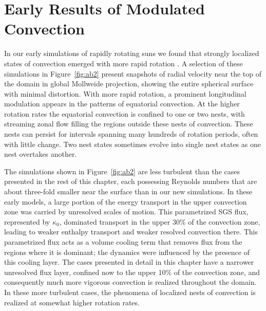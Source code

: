 \section{Early Results of Modulated Convection}
In our early simulations of rapidly rotating suns we found that
strongly localized states of convection emerged with more rapid
rotation \citep{Brown_et_al_2004}.  A selection of these simulations
in Figure~\ref{fig:ab2} present snapshots of radial velocity near the
top of the domain in global Mollweide projection, showing the entire
spherical surface with minimal distortion.  With more rapid rotation,
a prominent longitudinal modulation appears in the patterns of
equatorial convection.  At the higher rotation rates the equatorial
convection is confined to one or two nests, with streaming zonal flow
filling the regions outside these nests of convection.  These nests
can persist for intervals spanning many hundreds of rotation periods,
often with little change.  Two nest states sometimes evolve into
single nest states as one nest overtakes another.

The simulations shown in Figure~\ref{fig:ab2} are less turbulent than
the cases presented in the rest of this chapter, each possessing
Reynolds numbers that are about three-fold smaller near the surface
than in our new simulations. In these early models, a large portion of
the energy transport in the upper convection zone was carried by
unresolved scales of motion.  This parametrized SGS flux, represented
by $\kappa_0$, dominated transport in the upper 30\% of the convection
zone, leading to weaker enthalpy transport and weaker resolved
convection there.  This parametrized flux acts as a volume cooling term
that removes flux from the regions where it is dominant; the dynamics
were influenced by the presence of this cooling layer.  The cases
presented in detail in this chapter have a narrower unresolved flux layer,
confined now to the upper 10\% of the convection zone, and
consequently much more vigorous convection is realized throughout the
domain.
%
In these more turbulent cases, the phenomena of localized nests of
convection is realized at somewhat higher rotation rates.

%
% 

